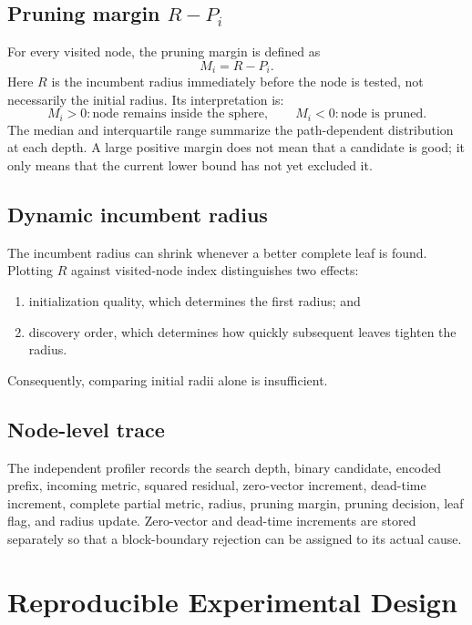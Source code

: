 \documentclass[paper=a4,oneside,fontsize=12pt,DIV=14,headings=normal,parskip=half,headsepline,numbers=noendperiod]{scrreprt}
\begin{document}
\section{Pruning margin $R-P_i$}
For every visited node, the pruning margin is defined as
\begin{equation}
 M_i=R-P_i.
 \label{eq:margin}
\end{equation}
Here $R$ is the incumbent radius immediately before the node is tested, not
necessarily the initial radius.  Its interpretation is:
\begin{equation}
 M_i>0: \text{node remains inside the sphere},\qquad
 M_i<0: \text{node is pruned}.
\end{equation}
The median and interquartile range summarize the path-dependent distribution
at each depth.  A large positive margin does not mean that a candidate is
good; it only means that the current lower bound has not yet excluded it.

\section{Dynamic incumbent radius}
The incumbent radius can shrink whenever a better complete leaf is found.
Plotting $R$ against visited-node index distinguishes two effects:
\begin{enumerate}
 \item initialization quality, which determines the first radius; and
 \item discovery order, which determines how quickly subsequent leaves tighten
 the radius.
\end{enumerate}
Consequently, comparing initial radii alone is insufficient.

\section{Node-level trace}
The independent profiler records the search depth, binary candidate, encoded
prefix, incoming metric, squared residual, zero-vector increment, dead-time
increment, complete partial metric, radius, pruning margin, pruning decision,
leaf flag, and radius update.  Zero-vector and dead-time increments are stored
separately so that a block-boundary rejection can be assigned to its actual
cause.

\chapter{Reproducible Experimental Design}
\end{document}

